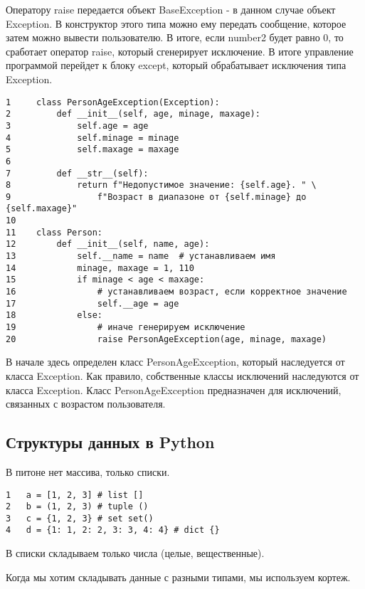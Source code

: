 \documentclass[12pt, a4paper]{article}
\begin{document}
Оператору raise передается объект BaseException - в данном случае объект Exception. В конструктор этого типа можно ему передать сообщение, которое затем можно вывести пользователю. В итоге, если number2 будет равно 0, то сработает оператор raise, который сгенерирует исключение. В итоге управление программой перейдет к блоку except, который обрабатывает исключения типа Exception.

\begin{verbatim}
1     class PersonAgeException(Exception):
2         def __init__(self, age, minage, maxage):
3             self.age = age
4             self.minage = minage
5             self.maxage = maxage
6     
7         def __str__(self):
8             return f"Недопустимое значение: {self.age}. " \
9                 f"Возраст в диапазоне от {self.minage} до {self.maxage}"
10 
11    class Person:
12        def __init__(self, name, age):
13            self.__name = name  # устанавливаем имя
14            minage, maxage = 1, 110
15            if minage < age < maxage:   
16                # устанавливаем возраст, если корректное значение
17                self.__age = age
18            else:                       
19                # иначе генерируем исключение
20                raise PersonAgeException(age, minage, maxage)
\end{verbatim}

В начале здесь определен класс PersonAgeException, который наследуется от класса Exception. Как правило, собственные классы исключений наследуются от класса Exception. Класс PersonAgeException предназначен для исключений, связанных с возрастом пользователя.

\subsection{Структуры данных в Python}

В питоне нет массива, только списки.

\begin{verbatim}
1   a = [1, 2, 3] # list []
2   b = (1, 2, 3) # tuple ()
3   c = {1, 2, 3} # set set()
4   d = {1: 1, 2: 2, 3: 3, 4: 4} # dict {}
\end{verbatim}

В списки складываем только числа (целые, вещественные).

\vspace{1 em}

Когда мы хотим складывать данные с разными типами, мы используем кортеж.
\end{document}
